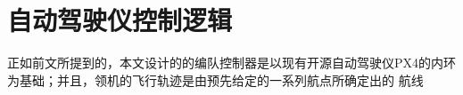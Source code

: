 %
%
%
%

\chapter{自动驾驶仪控制逻辑}
正如前文所提到的，本文设计的的编队控制器是以现有开源自动驾驶仪PX4的内环为基础；并且，领机的飞行轨迹是由预先给定的一系列航点所确定出的
航线
